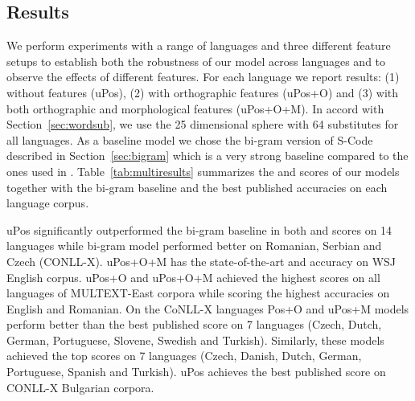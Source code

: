 \subsection{Results}
We perform experiments with a range of languages and three different
feature setups to establish both the robustness of our model across
languages and to observe the effects of different features.  For each
language we report results: (1) without features (uPos), (2) with
orthographic features (uPos+O) and (3) with both orthographic and
morphological features (uPos+O+M).  In accord with
Section~\ref{sec:wordsub}, we use the 25 dimensional sphere with 64
substitutes for all languages.  As a baseline model we chose the
bi-gram version of S-Code described in Section~\ref{sec:bigram} which
is a very strong baseline compared to the ones used in
\cite{christodoulopoulos-goldwater-steedman:2011:EMNLP}.
Table~\ref{tab:multiresults} summarizes the \mto and \vm scores of our
models together with the bi-gram baseline and the best published
accuracies on each language corpus.

uPos significantly outperformed the bi-gram baseline in both \mto and
\vm scores on 14 languages while bi-gram model performed better on
Romanian, Serbian and Czech (CONLL-X).  uPos+O+M has the
state-of-the-art \mto and \vm accuracy on WSJ English corpus.  uPos+O
and uPos+O+M achieved the highest \mto scores on all languages of
MULTEXT-East corpora while scoring the highest \vm accuracies on
English and Romanian.  On the CoNLL-X languages Pos+O and uPos+M
models perform better than the best published \mto score on 7
languages (Czech, Dutch, German, Portuguese, Slovene, Swedish and
Turkish).  Similarly, these models achieved the top \vm scores on 7
languages (Czech, Danish, Dutch, German, Portuguese, Spanish and
Turkish).  uPos achieves the best published \mto score on CONLL-X
Bulgarian corpora.

